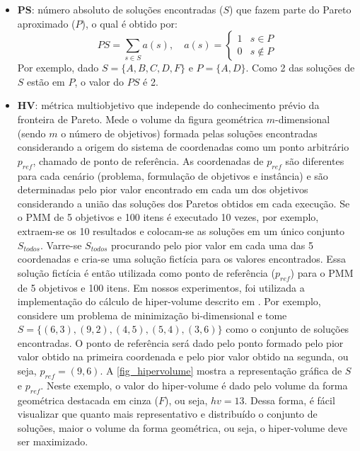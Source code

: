 \begin{itemize}
	\item \textbf{\ac{PS}}: número absoluto de soluções encontradas ($S$) que fazem parte do Pareto aproximado ($P$), o qual é obtido por:
	\begin{equation}
		PS = \sum\limits_{s \in S} a(s), \quad
		a(s) = 
		\begin{cases} 
			1 & s \in P \\
			0 & s \notin P
		\end{cases}
	\end{equation}
	Por exemplo, dado $S=\{A, B, C, D, F\}$ e $P=\{A,D\}$. Como 2 das soluções de $S$ estão em $P$, o valor do $PS$ é 2.
	\item \textbf{\ac{HV}}: métrica multiobjetivo que independe do conhecimento prévio da fronteira de Pareto. Mede o volume da figura geométrica $m$-dimensional (sendo $m$ o número de objetivos) formada pelas soluções encontradas considerando a origem do sistema de coordenadas como um ponto arbitrário $p_{ref}$, chamado de ponto de referência. As coordenadas de $p_{ref}$ são diferentes para cada cenário (problema, formulação de objetivos e instância) e são determinadas pelo pior valor encontrado em cada um dos objetivos considerando a união das soluções dos Paretos obtidos em cada execução. Se o PMM de 5 objetivos e 100 itens é executado 10 vezes, por exemplo, extraem-se os 10 resultados e colocam-se as soluções em um único conjunto $S_{todos}$. Varre-se $S_{todos}$ procurando pelo pior valor em cada uma das 5 coordenadas e cria-se uma solução fictícia para os valores encontrados. Essa solução fictícia é então utilizada como ponto de referência ($p_{ref}$) para o PMM de 5 objetivos e 100 itens. Em nossos experimentos, foi utilizada a implementação do cálculo de hiper-volume descrito em \footnotemark.
	Por exemplo, considere um problema de minimização bi-dimensional e tome $S=\{(6,3), (9,2), (4,5), (5,4), (3,6)\}$ como o conjunto de soluções encontradas. O ponto de referência será dado pelo ponto formado pelo pior valor obtido na primeira coordenada e pelo pior valor obtido na segunda, ou seja, $p_{ref}=(9,6)$. A \autoref{fig_hipervolume} mostra a representação gráfica de $S$ e $p_{ref}$. Neste exemplo, o valor do hiper-volume é dado pelo volume da forma geométrica destacada em cinza ($F$), ou seja, $hv=13$. Dessa forma, é fácil visualizar que quanto mais representativo e distribuído o conjunto de soluções, maior o volume da forma geométrica, ou seja, o hiper-volume deve ser maximizado.
	\begin{figure}[!htbp]
		\centering

\end{figure}
\end{itemize}

